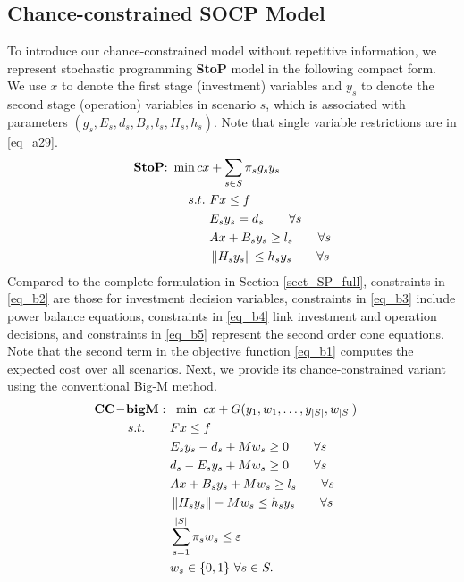 \documentclass[journal]{IEEEtran}
\theoremstyle{remark}
\begin{document}
\subsection{Chance-constrained SOCP Model}
 To introduce our chance-constrained model without repetitive information, we
 represent stochastic programming \textbf{StoP} model in the following compact form.  We use
  $x$ to denote the first stage (investment) variables and
  $y_s$ to denote the second stage (operation) variables in scenario $s$, which is associated with parameters $(g_s,E_s,d_s,B_s, l_s, H_s,h_s)$. Note that single variable restrictions are in \eqref{eq_a29}.
\begin{subequations}
\begin{align}
 {\bf{StoP}}{\rm{: }} \ \min cx &+ \sum_{s\in S}\pi_sg_sy_s    \label{eq_b1}\\
s.t. \ & Fx \le f        \label{eq_b2}\\
 & E_sy_s = d_s   \qquad \forall s  \label{eq_b3}\\
 & Ax + B_sy_s \ge l_s  \qquad \forall s  \label{eq_b4}\\
 & \left\| {H_sy_s} \right\| \le h_sy_s   \qquad \forall s \label{eq_b5}
\end{align}
\end{subequations}\vspace{-2pt}
  Compared to the complete
  formulation in Section \ref{sect_SP_full}, constraints in \eqref{eq_b2} are those for investment decision variables,  constraints in \eqref{eq_b3} include power balance equations, constraints in \eqref{eq_b4} link investment and operation decisions, and constraints in \eqref{eq_b5} represent the second order cone equations. Note that the second term in the objective function \eqref{eq_b1} computes the expected cost over all scenarios.  Next, we provide its chance-constrained variant using the conventional Big-M method. \vspace{-2pt}
    \begin{subequations}
\begin{align}
 {\bf{CC\!-\!bigM}}: \ & \ \min \ cx + G(y_1,w_1,\dots,y_{|S|},w_{|S|})    \label{eq_d1}\\
    s.t. \qquad  & Fx \le f         \label{eq_d2}\\
 & E_sy_s-d_s +Mw_s \ge 0 \qquad \forall s  \label{eq_d3}\\
  & {d_s} - {E_s}{y_s} + M{w_s} \ge 0 \qquad \forall s  \label{eq_d4} \\
  & Ax + {B_s}{y_s} + M{w_s} \ge {l_s} \qquad \forall s \label{eq_d5}\\
 & \left\| {{H_s}{y_s}} \right\| - M{w_s} \le {h_s}{y_s} \qquad \forall s \label{eq_d6}\\
 & \sum\limits_{s = 1}^{|S|} {{\pi _s}{w_s} \le \varepsilon }         & \label{eq_d7}\\
 & {w_s} \in \{ 0,1\} \ \forall s\in S.
\end{align}
\end{subequations}
\end{document}
